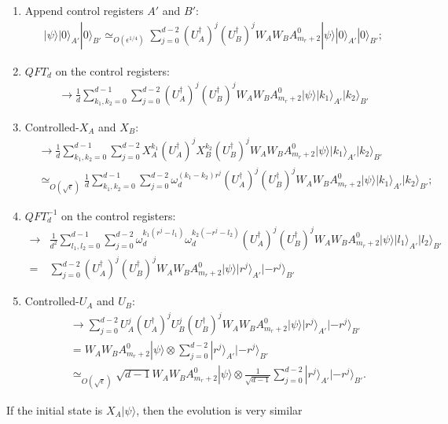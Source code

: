 \documentclass[11pt,letterpaper]{article}
\newcommand{\ket}[1]{|#1\rangle}
\newcommand{\x}{\otimes}
\newcommand{\ct}{^{\dagger}}
\newcommand{\1}{\mathbb{1}}
\newcommand{\appd}[1]{\simeq_{#1}}
\theoremstyle{definition}
\begin{document}
\begin{enumerate}
	\item Append control registers $A'$ and $B'$:
	\begin{align}
		\ket{\psi} \ket{0}_{A'}\ket{0}_{B'} \appd{O(\epsilon^{1/4})} 
		\sum_{j=0}^{d-2} (U_A\ct)^j (U_B\ct)^j W_AW_BA_{m_r+2}^0 \ket{\psi} \ket{0}_{A'}\ket{0}_{B'};
	\end{align}
	\item $QFT_d$ on the control registers:
	\begin{align}
		\to \frac{1}{d}\sum_{k_1,k_2 = 0}^{d-1} \sum_{j=0}^{d-2} (U_A\ct)^j (U_B\ct)^j W_AW_BA_{m_r+2}^0 \ket{\psi} \ket{k_1}_{A'}\ket{k_2}_{B'}
	\end{align}
	\item Controlled-$X_A$ and $X_B$:
	\begin{align}
		&\to \frac{1}{d}\sum_{k_1,k_2 = 0}^{d-1} \sum_{j=0}^{d-2} X_A^{k_1}(U_A\ct)^j X_B^{k_2}(U_B\ct)^j
		W_AW_BA_{m_r+2}^0 \ket{\psi} \ket{k_1}_{A'}\ket{k_2}_{B'}\\
		&\appd{O(\sqrt{\epsilon})}\frac{1}{d} \sum_{k_1,k_2 = 0}^{d-1} \sum_{j=0}^{d-2} \omega_d^{(k_1-k_2)r^j}
		(U_A\ct)^j(U_B\ct)^j W_AW_BA_{m_r+2}^0 \ket{\psi} \ket{k_1}_{A'}\ket{k_2}_{B'};
	\end{align}
	\item $QFT_d^{-1}$ on the control registers:
	\begin{align}
		\to &\frac{1}{d^2}\sum_{l_1,l_2 = 0}^{d-1}\sum_{j=0}^{d-2} \omega_d^{k_1(r^j-l_1)}\omega_d^{k_2(-r^j-l_2)}
		 (U_A\ct)^j(U_B\ct)^j W_AW_BA_{m_r+2}^0 \ket{\psi} \ket{l_1}_{A'}\ket{l_2}_{B'}\\
		= &\sum_{j=0}^{d-2}(U_A\ct)^j(U_B\ct)^j W_AW_BA_{m_r+2}^0 \ket{\psi} \ket{r^j}_{A'}\ket{-r^j}_{B'}
	\end{align}
	\item Controlled-$U_A$ and $U_B$:
	\begin{align}
		&\to \sum_{j=0}^{d-2} U_A^j (U_A\ct)^j U_B^j (U_B\ct)^j W_AW_BA_{m_r+2}^0 \ket{\psi} \ket{r^j}_{A'}\ket{-r^j}_{B'}\\
		&= W_AW_BA_{m_r+2}^0 \ket{\psi} \x \sum_{j=0}^{d-2} \ket{r^j}_{A'}\ket{-r^j}_{B'}\\
		&\appd{O(\sqrt{\epsilon})} \sqrt{d-1}W_AW_BA_{m_r+2}^0 \ket{\psi} \x \frac{1}{\sqrt{d-1}} \sum_{j=0}^{d-2} \ket{r^j}_{A'}\ket{-r^j}_{B'}.
	\end{align}
\end{enumerate}
If the initial state is $X_A\ket{\psi}$, then the evolution is very similar 
\end{document}
